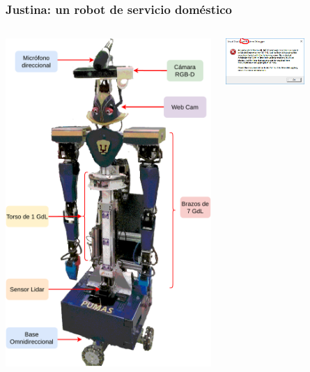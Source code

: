 \documentclass[10pt,spanish,aspectratio=1610]{beamer}
\begin{document}
\begin{frame}\frametitle{Justina: un robot de servicio doméstico}
  \begin{columns}
    \begin{column}{0.4\textwidth}
      \includegraphics[width=\textwidth]{Figures/JustinaHardware.pdf}
    \end{column}
    \begin{column}{0.6\textwidth}
      \centering
      \includegraphics[width=0.6\textwidth]{Figures/JustInTimeDebug.png}

\end{column}
\end{columns}
\end{frame}
\end{document}
